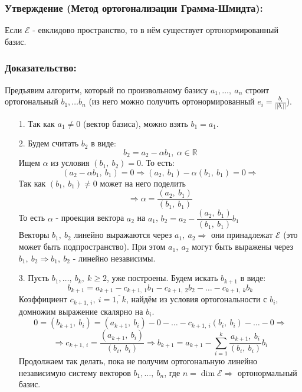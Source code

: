 \documentclass[12pt, letterpaper, twoside]{article}
\newcommand{\mb}[1]{\mathbb{#1}}
\begin{document}
    \subsubsection*{Утверждение (Метод ортогонализации Грамма-Шмидта):}
    Если $\mathcal{E}$ - евклидово пространство, то в нём существует ортонормированный базис.
    \subsubsection*{Доказательство:}
    Предъявим алгоритм, который по произвольному базису $a_1,\dots,\ a_n$ строит ортогональный $b_1,\dots b_n$ (из него можно получить ортонормированный $e_i = \frac{b_i}{||b_i||}$).
    \begin{enumerate}
        \item[1.] Так как $a_1\neq 0$ (вектор базиса), можно взять $b_1 = a_1$.
        \item[2.] Будем считать $b_2$ в виде:
        \[b_2 = a_2 - \alpha b_1,\ \alpha\in \mb{R}\]
        Ищем $\alpha$ из условия $(b_1,\ b_2) = 0$. То есть:
        \[(a_2 - \alpha b_1,\ b_1) = 0\Rightarrow (a_2,\ b_1) - \alpha(b_1,\ b_1) = 0\Rightarrow\]
        Так как $(b_1,\ b_1)\neq 0$ может на него поделить
        \[\Rightarrow \alpha = \frac{(a_2,\ b_1)}{(b_1,\ b_1)}\]
        То есть $\alpha$ - проекция вектора $a_2$ на $a_1$, $b_2 = a_2 - \dfrac{(a_2,\ b_1)}{(b_1,\ b_1)}b_1$\\
        Векторы $b_1,\ b_2$ линейно выражаются через $a_1,\ a_2\Rightarrow$ они принадлежат $\mathcal{E}$ (это может быть подпространство). При этом $a_1,\ a_2$ могут быть выражены через $b_1,\ b_2\Rightarrow b_1,\ b_2$ - линейно независимы.
        \item[3.] Пусть $b_1,\dots,\ b_k,\ k\geq 2$, уже построены. Будем искать $b_{k + 1}$ в виде:
        \[b_{k + 1} = a_{k + 1} - c_{k + 1,\ 1}b_1 - c_{k + 1,\ 2} b_2 - \dots - c_{k + 1,\ k} b_k\]
        Коэффициент $c_{k + 1,\ i},\ i = \overline{1,\ k}$, найдём из условия ортогональности с $b_i$, домножим выражение скалярно на $b_i$.
        \[0 = (b_{k + 1},\ b_i) = (a_{k + 1},\ b_i) - 0 - \dots - c_{k + 1,\ i}(b_i,\ b_i) - \dots - 0\Rightarrow\]
        \[\Rightarrow c_{k + 1,\ i} = \frac{(a_{k + 1},\ b_i)}{(b_i,\ b_i)}\Rightarrow b_{k + 1} = a_{k + 1} - \sum_{i = 1}^{k} \frac{a_{k + 1},\ b_i}{(b_i,\ b_i)}b_i\]
        Продолжаем так делать, пока не получим ортогональную линейно независимую систему векторов $b_1,\dots,\ b_n$, где $n = \dim \mathcal{E}\Rightarrow$ ортонормальный базис.
    \end{enumerate}
\end{document}
